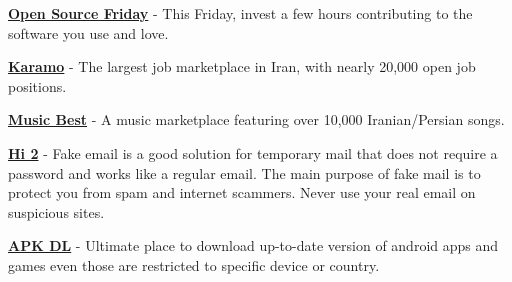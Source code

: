 \documentclass[a4paper,10pt]{article}
\begin{document}
\textbf{\href{https://opensourcefriday.com/}{Open Source Friday}} - This Friday, invest a few hours contributing to the software you use and love.





\textbf{\href{https://karamo.ir/}{Karamo}} - The largest job marketplace in Iran, with nearly 20,000 open job positions.

\textbf{\href{https://music-best.ir/}{Music Best}} - A music marketplace featuring over 10,000 Iranian/Persian songs.

\textbf{\href{https://hi2.in/}{Hi 2}} - Fake email is a good solution for temporary mail that does not require a password and works like a regular email. The main purpose of fake mail is to protect you from spam and internet scammers. Never use your real email on suspicious sites.

\textbf{\href{https://apkdl.net/}{APK DL}} - Ultimate place to download up-to-date version of android apps and games even those are restricted to specific device or country.
\end{document}
